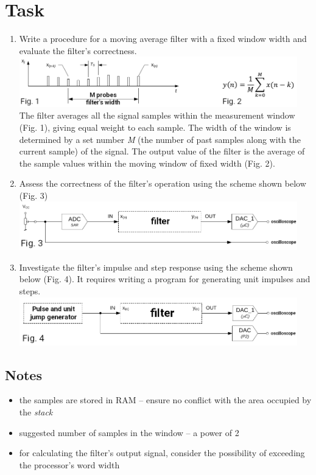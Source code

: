 \documentclass{article}
\begin{document}
\section*{Task}
\begin{enumerate}[label=\Alph*.]
    \item Write a procedure for a moving average filter with a fixed window width and evaluate the filter's correctness. \\
    \includegraphics[width=0.95\textwidth]{../img/filter_mean_a.png} \\
    The filter averages all the signal samples within the measurement window (Fig. 1), giving equal weight to each sample. The width of the window is determined by a set number \textit{M} (the number of past samples along with the current sample) of the signal. The output value of the filter is the average of the sample values within the moving window of fixed width (Fig. 2).

    \item Assess the correctness of the filter's operation using the scheme shown below (Fig. 3) \\
    \includegraphics[width=0.95\textwidth]{../img/filter_mean_b.png}

    \item Investigate the filter's impulse and step response using the scheme shown below (Fig. 4). It requires writing a program for generating unit impulses and steps. \\
    \includegraphics[width=0.95\textwidth]{../img/filter_c.png}
\end{enumerate}

\subsection*{Notes}
\begin{itemize}
    \item the samples are stored in RAM – ensure no conflict with the area occupied by the \textit{stack}
    \item suggested number of samples in the window – a power of 2
    \item for calculating the filter’s output signal, consider the possibility of exceeding the processor's word width
\end{itemize}
\end{document}
